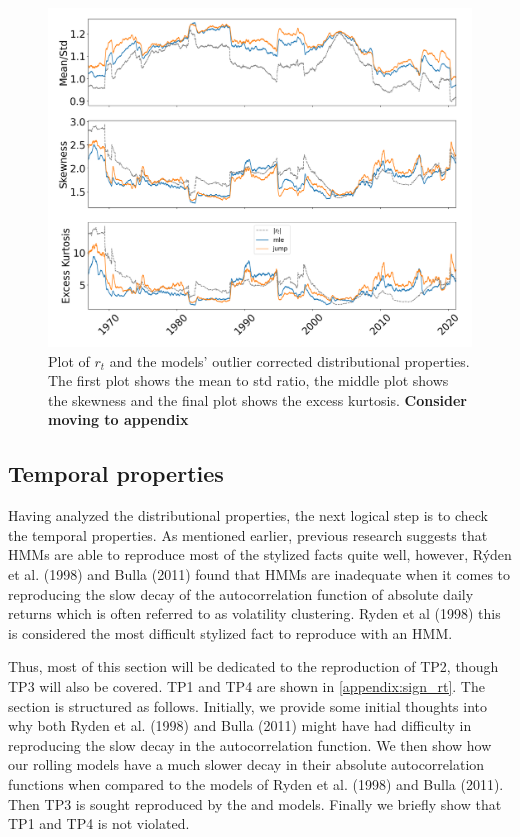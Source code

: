 \begin{figure}[H] 
    \centering
    \includegraphics[width=1.0\textwidth]{analysis/stylized_facts/images/moments_bulla_abs_outlier.png}
    \caption[Plot of $r_t$ and the models' outlier corrected distributional properties]{Plot of $r_t$ and the models' outlier corrected distributional properties. The first plot shows the mean to std ratio, the middle plot shows the skewness and the final plot shows the excess kurtosis. \textbf{Consider moving to appendix}}
    \label{fig:stylized_facts_moments_bulla_abs_outliers} 
\end{figure}

\subsection{Temporal properties}
\label{Sec: Temporal properties}

Having analyzed the distributional properties, the next logical step is to check the temporal properties. As mentioned earlier, previous research suggests that HMMs are able to reproduce most of the stylized facts quite well, however, Rýden et al. (1998) and Bulla (2011) found that HMMs are inadequate when it comes to reproducing the slow decay of the autocorrelation function of absolute daily returns which is often referred to as volatility clustering. Ryden et al (1998) this is considered the most difficult stylized fact to reproduce with an HMM.

Thus, most of this section will be dedicated to the reproduction of TP2, though TP3 will also be covered. TP1 and TP4 are shown in \cref{appendix:sign_rt}. The section is structured as follows. Initially, we provide some initial thoughts into why both Ryden et al. (1998) and Bulla (2011) might have had difficulty in reproducing the slow decay in the autocorrelation function. We then show how our rolling models have a much slower decay in their absolute autocorrelation functions when compared to the models of Ryden et al. (1998) and Bulla (2011). Then TP3 is sought reproduced by the \mle and \jump models. Finally we briefly show that TP1 and TP4 is not violated.

